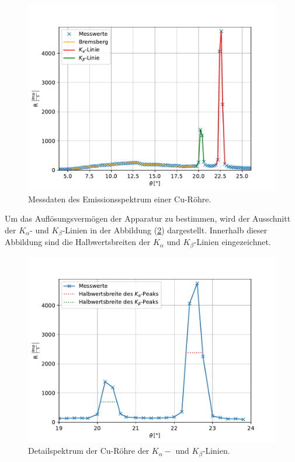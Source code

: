 \begin{figure}[H]
  \centering
  \includegraphics{content/Plots/Emissionsspektrum.pdf}
  \caption{Messdaten des Emissionsspektrum einer Cu-Röhre.}
  \label{fig:Emissionsspektrum}
\end{figure}
Um das Auflösungsvermögen der Apparatur zu bestimmen, wird der Ausschnitt der $K_{\alpha}$-
und $K_{\beta}$-Linien in der Abbildung (\ref{fig:Detailspektrum}) dargestellt. Innerhalb dieser Abbildung
sind die Halbwertsbreiten der $K_{\alpha}$ und $K_{\beta}$-Linien eingezeichnet. 
\begin{figure}[H]
  \centering
  \includegraphics{content/Plots/Detailspektrum.pdf}
  \caption{Detailspektrum der Cu-Röhre der $K_{\alpha}-$ und $K_{\beta}$-Linien.}
  \label{fig:Detailspektrum}
\end{figure}
